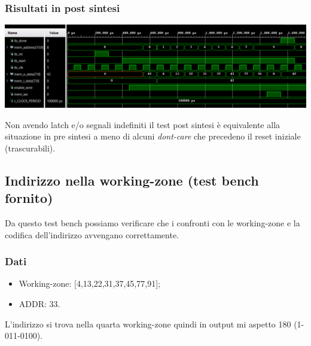 \documentclass{article}
\begin{document}
\subsubsection{Risultati in post sintesi}
\includegraphics[width=\textwidth]{tb0-ps.png}

Non avendo latch e/o segnali indefiniti il test post sintesi è equivalente alla situazione in pre sintesi a meno di alcuni \textit{dont-care} che precedeno il reset iniziale (trascurabili).
\subsection{Indirizzo nella working-zone (test bench fornito)}
Da questo test bench possiamo verificare che i confronti con le working-zone e la codifica dell'indirizzo avvengano correttamente.
\subsubsection{Dati}
\begin{itemize}
	\item Working-zone: [4,13,22,31,37,45,77,91];
	\item ADDR: 33.
\end{itemize}
L'indirizzo si trova nella quarta working-zone quindi in output mi aspetto 180 (1-011-0100).
\end{document}
